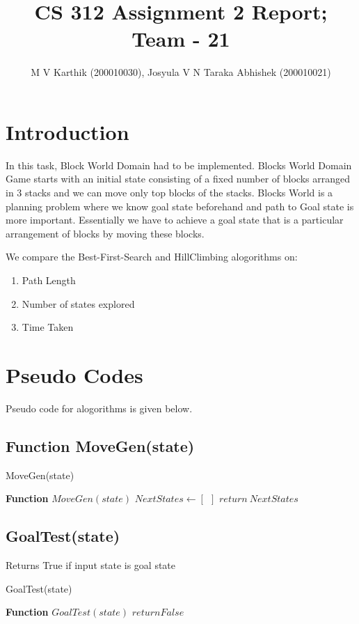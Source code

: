 \documentclass{article}
\title{CS 312 Assignment 2 Report; Team - 21}
\author{M V Karthik (200010030), Josyula V N Taraka Abhishek (200010021)}
\begin{document}
\maketitle
                 
\section{Introduction}
In this task, Block World Domain had to be implemented. Blocks World Domain Game
starts with an initial state consisting of a fixed number of blocks arranged in 3 stacks and
we can move only top blocks of the stacks. Blocks World is a planning problem where we
know goal state beforehand and path to Goal state is more important. Essentially we have
to achieve a goal state that is a particular arrangement of blocks by moving these blocks. 

We compare the Best-First-Search and HillClimbing alogorithms on:
\begin{enumerate}
    \item Path Length
    \item Number of states explored
    \item Time Taken
\end{enumerate}

\section{Pseudo Codes}
Pseudo code for  alogorithms is given below.

\subsection{Function MoveGen(state)}


\begin{algorithm}[H]
    \caption{MoveGen(state)}
    \textbf{Function} $MoveGen(state)$ \;
    $NextStates \leftarrow [~~]$\;
    $return ~ NextStates$      
\end{algorithm}

\subsection{GoalTest(state)}
Returns True if input state is goal state
\\
\begin{algorithm}[H]
    \caption{GoalTest(state)}
    \textbf{Function} $GoalTest(state)$ \;
    $return False$
\end{algorithm}
\end{document}
